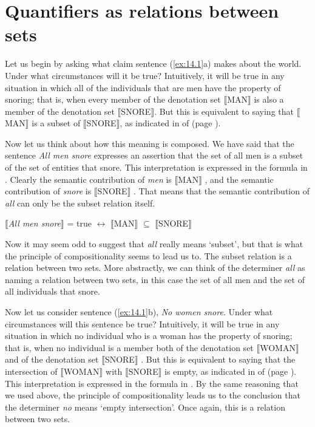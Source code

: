 \section{Quantifiers as relations between sets}\label{sec:14.2}

Let us begin by asking what claim sentence (\ref{ex:14.1}a) makes about the world. Under what circumstances will it be true? Intuitively, it will be true in any situation in which all of the individuals that are men have the property of snoring; that is, when every member of the denotation set $\llbracket$MAN$\rrbracket$  is also a member of the denotation set $\llbracket$SNORE$\rrbracket$. But this is equivalent to saying that $\llbracket$MAN$\rrbracket$  is a subset of $\llbracket$SNORE$\rrbracket$, as indicated in  of  (page \pageref{extab:13.19}).



Now let us think about how this meaning is composed. We have said that the sentence \textit{All men snore} expresses an assertion that the set of all men is a subset of the set of entities that snore. This interpretation is expressed in the formula in . Clearly the semantic contribution of \textit{men} is $\llbracket$MAN$\rrbracket$ , and the semantic contribution of \textit{snore} is $\llbracket$SNORE$\rrbracket$ . That means that the semantic contribution of \textit{all} can only be the subset relation itself.


\ea \label{ex:14.2}
{}$\llbracket$\textit{All men snore}$\rrbracket$  = true $\leftrightarrow $ $\llbracket$MAN$\rrbracket$  ${\subseteq}$ $\llbracket$SNORE$\rrbracket$ 
\z


Now it may seem odd to suggest that \textit{all} really means ‘subset’, but that is what the principle of compositionality seems to lead us to. The subset relation is a relation between two sets. More abstractly, we can think of the determiner \textit{all} as naming a relation between two sets, in this case the set of all men and the set of all individuals that snore.



Now let us consider sentence (\ref{ex:14.1}b), \textit{No women snore}. Under what circumstances will this sentence be true? Intuitively, it will be true in any situation in which no individual who is a woman has the property of snoring; that is, when no individual is a member both of the denotation set $\llbracket$WOMAN$\rrbracket$  and of the denotation set $\llbracket$SNORE$\rrbracket$ . But this is equivalent to saying that the intersection of $\llbracket$WOMAN$\rrbracket$  with $\llbracket$SNORE$\rrbracket$  is empty, as indicated in  of  (page \pageref{extab:13.19}). This interpretation is expressed in the formula in . By the same reasoning that we used above, the principle of compositionality leads us to the conclusion that the determiner \textit{no} means ‘empty intersection’. Once again, this is a relation between two sets.


